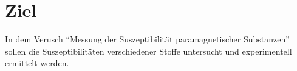 \section{Ziel}
\label{sec:Ziel}

In dem Verusch \enquote{Messung der Suszeptibilität paramagnetischer Substanzen} sollen
die Suszeptibilitäten verschiedener Stoffe untersucht und experimentell ermittelt werden.
